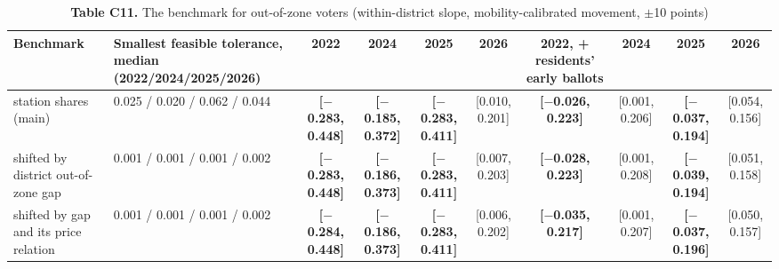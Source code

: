 \begin{table}[!htbp]
\centering
\scriptsize
\setlength{\tabcolsep}{3.5pt}
\caption*{\textbf{Table C11.} The benchmark for out-of-zone voters (within-district slope, mobility-calibrated movement, $\pm $10 points)}
\begin{tabularx}{\linewidth}{lLCCCCCCCC}
\toprule
Benchmark & Smallest feasible tolerance, median (2022/2024/2025/2026) & 2022 & 2024 & 2025 & 2026 & 2022, + residents' early ballots & 2024 & 2025 & 2026 \\
\midrule
station shares (main) & 0.025 / 0.020 / 0.062 / 0.044 & \textbf{[$-$0.283, 0.448]} & \textbf{[$-$0.185, 0.372]} & \textbf{[$-$0.283, 0.411]} & [0.010, 0.201] & \textbf{[$-$0.026, 0.223]} & [0.001, 0.206] & \textbf{[$-$0.037, 0.194]} & [0.054, 0.156] \\
shifted by district out-of-zone gap & 0.001 / 0.001 / 0.001 / 0.002 & \textbf{[$-$0.283, 0.448]} & \textbf{[$-$0.186, 0.373]} & \textbf{[$-$0.283, 0.411]} & [0.007, 0.203] & \textbf{[$-$0.028, 0.223]} & [0.001, 0.208] & \textbf{[$-$0.039, 0.194]} & [0.051, 0.158] \\
shifted by gap and its price relation & 0.001 / 0.001 / 0.001 / 0.002 & \textbf{[$-$0.284, 0.448]} & \textbf{[$-$0.186, 0.373]} & \textbf{[$-$0.283, 0.411]} & [0.006, 0.202] & \textbf{[$-$0.035, 0.217]} & [0.001, 0.207] & \textbf{[$-$0.037, 0.196]} & [0.050, 0.157] \\
\bottomrule
\end{tabularx}

\end{table}
